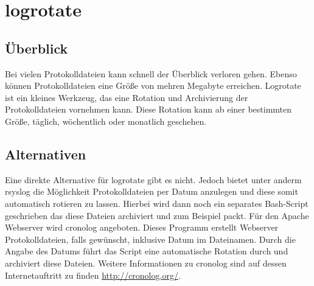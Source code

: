 \section{logrotate}
\subsection{Überblick}
Bei vielen Protokolldateien kann schnell der Überblick verloren gehen. Ebenso können Protokolldateien eine Größe von mehren Megabyte erreichen. Logrotate ist ein kleines Werkzeug, das eine Rotation und Archivierung der Protokolldateien vornehmen kann. Diese Rotation kann ab einer bestimmten Größe, täglich, wöchentlich oder monatlich geschehen.

\subsection{Alternativen}
Eine direkte Alternative für logrotate gibt es nicht. Jedoch bietet unter anderm rsyslog die Möglichkeit Protokolldateien per Datum anzulegen und diese somit automatisch rotieren zu lassen. Hierbei wird dann noch ein separates Bash-Script geschrieben das diese Dateien archiviert und zum Beispiel packt.
Für den Apache Webserver wird cronolog angeboten. Dieses Programm erstellt Webserver Protokolldateien, falls gewünscht, inklusive Datum im Dateinamen. Durch die Angabe des Datums führt das Script eine automatische Rotation durch und archiviert diese Dateien. Weitere Informationen zu cronolog sind auf dessen Internetauftritt zu finden \url{http://cronolog.org/}. 
